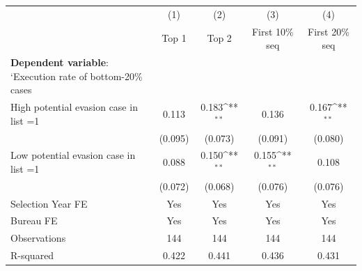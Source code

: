 {
\def\sym#1{\ifmmode^{#1}\else\(^{#1}\)\fi}
\begin{tabular}{l*{4}{c}}
\toprule
            &\multicolumn{1}{c}{(1)}&\multicolumn{1}{c}{(2)}&\multicolumn{1}{c}{(3)}&\multicolumn{1}{c}{(4)}\\
            &\multicolumn{1}{c}{Top 1}&\multicolumn{1}{c}{Top 2}&\multicolumn{1}{c}{First 10\% seq}&\multicolumn{1}{c}{First 20\% seq}\\
\midrule
\textbf{Dependent variable}: `Execution rate of bottom-20\% cases&                     &                     &                     &                     \\
\addlinespace
High potential evasion case in list =1&       0.113         &       0.183\sym{**} &       0.136         &       0.167\sym{**} \\
            &     (0.095)         &     (0.073)         &     (0.091)         &     (0.080)         \\
\addlinespace
Low potential evasion case in list =1&       0.088         &       0.150\sym{**} &       0.155\sym{**} &       0.108         \\
            &     (0.072)         &     (0.068)         &     (0.076)         &     (0.076)         \\
\midrule
Selection Year FE&         Yes         &         Yes         &         Yes         &         Yes         \\
Bureau FE   &         Yes         &         Yes         &         Yes         &         Yes         \\
Observations&         144         &         144         &         144         &         144         \\
R-squared   &       0.422         &       0.441         &       0.436         &       0.431         \\
\bottomrule
\end{tabular}
}
